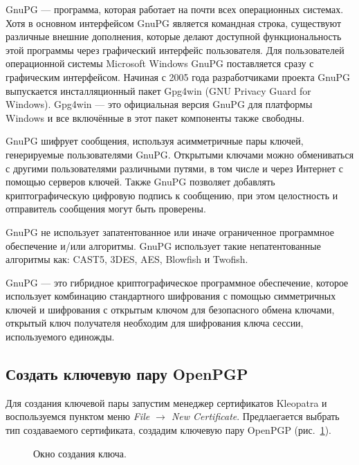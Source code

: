 \documentclass[10pt,a4paper,titlepage]{article}
\begin{document}
GnuPG — программа, которая работает на почти всех операционных системах. Хотя в основном интерфейсом GnuPG является командная строка, существуют различные внешние дополнения, которые делают доступной функциональность этой программы через графический интерфейс пользователя. Для пользователей операционной системы Microsoft Windows GnuPG поставляется сразу с графическим интерфейсом. Начиная с 2005 года разработчиками проекта GnuPG выпускается инсталляционный пакет Gpg4win (GNU Privacy Guard for Windows). Gpg4win — это официальная версия GnuPG для платформы Windows и все включённые в этот пакет компоненты также свободны.

GnuPG шифрует сообщения, используя асимметричные пары ключей, генерируемые пользователями GnuPG. Открытыми ключами можно обмениваться с другими пользователями различными путями, в том числе и через Интернет с помощью серверов ключей. Также GnuPG позволяет добавлять криптографическую цифровую подпись к сообщению, при этом целостность и отправитель сообщения могут быть проверены.

GnuPG не использует запатентованное или иначе ограниченное программное обеспечение и/или алгоритмы. GnuPG использует такие непатентованные алгоритмы как: CAST5, 3DES, AES, Blowfish и Twofish.

GnuPG — это гибридное криптографическое программное обеспечение, которое использует комбинацию стандартного шифрования с помощью симметричных ключей и шифрования с открытым ключом для безопасного обмена ключами, открытый ключ получателя необходим для шифрования ключа сессии, используемого единожды.

\subsection{Создать ключевую пару OpenPGP}
Для создания ключевой пары запустим менеджер сертификатов Kleopatra и воспользуемся пунктом меню \textit{File $\rightarrow$ New Certificate}. Предлаегается выбрать тип создаваемого сертификата, создадим ключевую пару OpenPGP \mbox{(рис. \ref{ris:image1}).}

\begin{figure}[h]	
\caption{Окно создания ключа.}
\label{ris:image1}
\end{figure}
\end{document}
